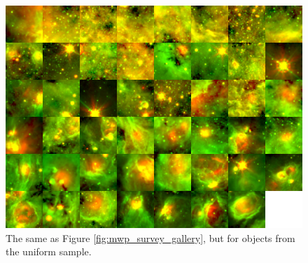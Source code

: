 \begin{figure}
\includegraphics[width=6in]{uniform_survey_gallery}
\caption{The same as Figure \ref{fig:mwp_survey_gallery}, but for objects from the uniform sample.}
\label{fig:uniform_survey_gallery}
\end{figure}

